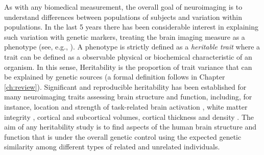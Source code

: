  As with any biomedical measurement, the overall goal of neuroimaging is to understand differences between populations of subjects and variation within populations.  In the last 5 years there has been considerable interest in explaining such variation with genetic markers, treating the brain imaging measure as a phenotype (see, e.g., \cite{Glahn2007}). A phenotype is strictly defined as a \emph{heritable trait} where a trait  can be defined as a observable physical or biochemical characteristic of an organism. In this sense, Heritability is the proportion of trait variance that can be explained by genetic sources (a formal definition follows in Chapter \ref{ch:review}). Significant and reproducible heritability has been established for many neuroimaging traits assessing brain structure and function, including, for instance, location and strength of  task-related brain activation \citep{Blokland2008,Koten2009,Matthews2007,Polk2007}, white matter integrity \citep{Kochunov2014a,Kochunov2014b,Jahanshad2013,Brouwer2010,Chiang2009,Chiang2011,
Kochunov2010}, cortical and subcortical volumes, cortical thickness and density \citep{Winkler2010,Rimol2010,Kochunov2011a,Kochunov2011b,Kremen2010,Braber2013}.
The aim of any heritability study is to find  aspects of the human brain structure and function that is under the overall genetic control using the expected genetic similarity among different types of related and unrelated individuals. 


